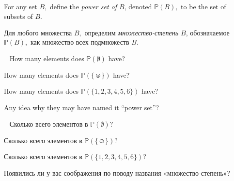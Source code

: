 \documentclass[../main/CT4S-EN-RU]{subfiles}
\begin{document}

\subsection{}

\begin{definitionENG}\label{def:power set}
For any set $B,$ define the {\em power set of $B$}, denoted ${ℙ}(B),$ to be the set of subsets of $B.$
\end{definitionENG}

\begin{definitionRUS}\label{def:power set}
Для любого множества $B,$ определим {\em множество-степень $B$}, обозначаемое ${ℙ}(B),$ как множество всех подмножеств $B.$
\end{definitionRUS}

\begin{exerciseENG}\label{exc:size of power sets}~
\sexc How many elements does ${ℙ}(\emptyset)$ have? 
\item How many elements does ${ℙ}({\{☺\}})$ have? 
\item How many elements does ${ℙ}(\{1,2,3,4,5,6\})$ have? 
\item Any idea why they may have named it “power set”?
\endsexc
\end{exerciseENG}

\begin{exerciseRUS}\label{exc:size of power sets}~
\sexc Сколько всего элементов в ${ℙ}(\emptyset)?$ 
\item Сколько всего элементов в ${ℙ}({\{☺\}})?$ 
\item Сколько всего элементов в ${ℙ}(\{1,2,3,4,5,6\})?$ 
\item Появились ли у вас соображения по поводу названия «множество-степень»?
\endsexc
\end{exerciseRUS}


\subsubsection{}\label{sec:simplicial complex}
\end{document}
